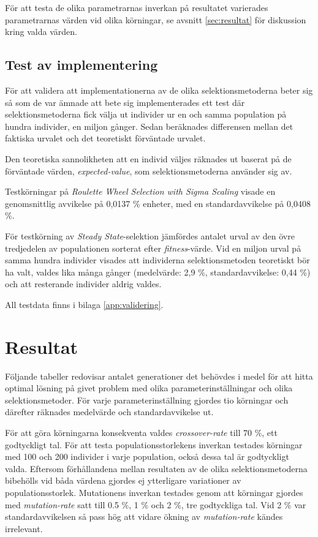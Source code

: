 \documentclass[titlepage, a4paper, 12pt]{article}
\begin{document}
För att testa de olika parametrarnas inverkan på resultatet varierades
parametrarnas värden vid olika körningar, se avsnitt
\vref{sec:resultat} för diskussion kring valda värden.

\subsection{Test av implementering}
För att validera att implementationerna av de olika
selektionsmetoderna beter sig så som de var ämnade att bete sig
implementerades ett test där selektionsmetoderna fick välja ut
individer ur en och samma population på hundra individer, en miljon
gånger. Sedan beräknades differensen mellan det faktiska urvalet och
det teoretiskt förväntade urvalet.

Den teoretiska sannolikheten att en individ väljes räknades ut baserat
på de förväntade värden, \textit{expected-value}, som
selektionsmetoderna använder sig av.

Testkörningar på \textit{Roulette Wheel Selection with Sigma Scaling}
visade en genomsnittlig avvikelse på 0,0137 \% enheter, med en
standardavvikelse på 0,0408 \%.

För testkörning av \textit{Steady State}-selektion jämfördes antalet
urval av den övre tredjedelen av populationen sorterat efter
\textit{fitness}-värde. Vid en miljon urval på samma hundra individer
visades att individerna selektionsmetoden teoretiskt bör ha valt,
valdes lika många gånger (medelvärde: 2,9 \%, standardavvikelse: 0,44
\%) och att resterande individer aldrig valdes.

All testdata finns i bilaga
\ref{app:validering}.

\section{Resultat}\label{sec:resultat}
Följande tabeller redovisar antalet generationer det behövdes i medel
för att hitta optimal lösning på givet problem med olika
parameterinställningar och olika selektionsmetoder. För varje
parameterinställning gjordes tio körningar och därefter räknades
medelvärde och standardavvikelse ut.

För att göra körningarna konsekventa valdes \textit{crossover-rate}
till 70 \%, ett godtyckligt tal. För att testa populationsstorlekens
inverkan testades körningar med 100 och 200 individer i varje
population, också dessa tal är godtyckligt valda. Eftersom
förhållandena mellan resultaten av de olika selektionsmetoderna
bibehölls vid båda värdena gjordes ej ytterligare variationer av
populations\-storlek. Mutationens inverkan testades genom att
körningar gjordes med \textit{mutation-rate} satt till 0.5 \%, 1 \%
och 2 \%, tre godtyckliga tal. Vid 2 \% var standardavvikelsen så pass
hög att vidare ökning av \textit{mutation-rate} kändes irrelevant.
\end{document}
